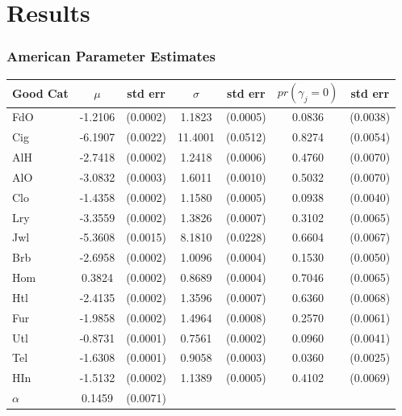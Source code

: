 \documentclass{beamer}
\begin{document}
\section{Results}
\begin{frame}
  \frametitle{American Parameter Estimates}
\begin{table}
	\begin{center}
	  \small
		\begin{tabular}{|l|c c |c c |c c|}
			\hline
			Good Cat & $\mu$ & std err      & $\sigma$ & std err       & $pr(\gamma_j =  0)$ & std err\\
			\hline
			FdO & -1.2106 &  (0.0002) &  1.1823 & (0.0005) &   0.0836 & (0.0038)\\ 
			\hline
			Cig & -6.1907 &  (0.0022) & 11.4001 & (0.0512) &   0.8274 & (0.0054)\\ 
			\hline
			AlH & -2.7418 &  (0.0002) &  1.2418 & (0.0006) &   0.4760 & (0.0070)\\ 
			\hline
			AlO & -3.0832 &  (0.0003) &  1.6011 & (0.0010) &   0.5032 & (0.0070)\\ 
			\hline
			Clo & -1.4358 &  (0.0002) &  1.1580 & (0.0005) &   0.0938 & (0.0040)\\ 
			\hline
			Lry & -3.3559 &  (0.0002) &  1.3826 & (0.0007) &   0.3102 & (0.0065)\\ 
			\hline
			Jwl & -5.3608 &  (0.0015) &  8.1810 & (0.0228) &   0.6604 & (0.0067)\\ 
			\hline
			Brb & -2.6958 &  (0.0002) &  1.0096 & (0.0004) &   0.1530 & (0.0050)\\ 
			\hline
			Hom &  0.3824 &  (0.0002) &  0.8689 & (0.0004) &   0.7046 & (0.0065)\\ 
			\hline
			Htl & -2.4135 &  (0.0002) &  1.3596 & (0.0007) &   0.6360 & (0.0068)\\ 
			\hline
			Fur & -1.9858 &  (0.0002) &  1.4964 & (0.0008) &   0.2570 & (0.0061)\\ 
			\hline
			Utl & -0.8731 &  (0.0001) &  0.7561 & (0.0002) &   0.0960 & (0.0041)\\ 
			\hline
			Tel & -1.6308 &  (0.0001) &  0.9058 & (0.0003) &   0.0360 & (0.0025)\\ 
			\hline
			HIn & -1.5132 &  (0.0002) &  1.1389 & (0.0005) &   0.4102 & (0.0069)\\ 
			\hline
		        \hline	
			$\alpha$ & 0.1459 & (0.0071) & & & & \\
			\hline
		\end{tabular}
	\end{center}
	\label{tab:parest}
\end{table}
\end{frame}
\end{document}
